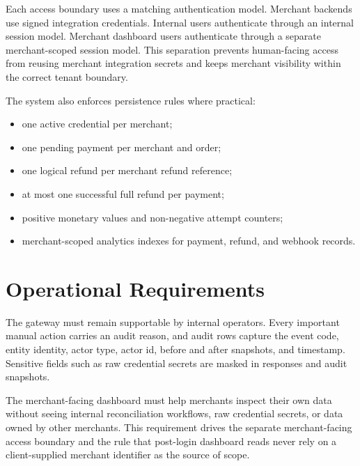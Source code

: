 Each access boundary uses a matching authentication model. Merchant backends use
signed integration credentials. Internal users authenticate through an internal
session model. Merchant dashboard users authenticate through a separate
merchant-scoped session model. This separation prevents human-facing access from
reusing merchant integration secrets and keeps merchant visibility within the
correct tenant boundary.

The system also enforces persistence rules where practical:

\begin{itemize}
  \item one active credential per merchant;
  \item one pending payment per merchant and order;
  \item one logical refund per merchant refund reference;
  \item at most one successful full refund per payment;
  \item positive monetary values and non-negative attempt counters;
  \item merchant-scoped analytics indexes for payment, refund, and webhook
  records.
\end{itemize}

\section{Operational Requirements}

The gateway must remain supportable by internal operators. Every important
manual action carries an audit reason, and audit rows capture the event code,
entity identity, actor type, actor id, before and after snapshots, and
timestamp. Sensitive fields such as raw credential secrets are masked in
responses and audit snapshots.

The merchant-facing dashboard must help merchants inspect their own data without
seeing internal reconciliation workflows, raw credential secrets, or data owned
by other merchants. This requirement drives the separate merchant-facing access
boundary and the rule that post-login dashboard reads never rely on a
client-supplied merchant identifier as the source of scope.
